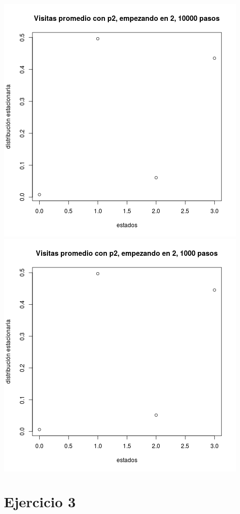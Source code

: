\documentclass[paper=letter, fontsize=12pt]{scrartcl} %
\numberwithin{equation}{section} %
\numberwithin{figure}{section} %
\numberwithin{table}{section} %
\begin{document}
\includegraphics[scale=0.5]{ej1_4.png} \includegraphics[scale=0.5]{ej1_5.png}

\section{Ejercicio 3}
\end{document}
